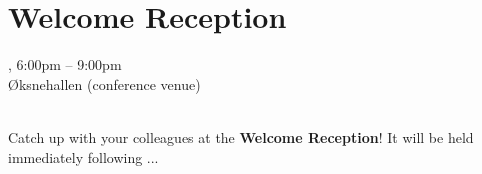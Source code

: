 \clearpage
\section[Welcome Reception]{Welcome Reception}
\setheaders{}{\daydateyear}

\begin{center}



\daydateyear, 6:00pm -- 9:00pm \vspace{1em}\\
Øksnehallen (conference venue)\\
\WelcomeReceptionLoc\\
\end{center}

\noindent Catch up with your colleagues at the \textbf{Welcome
Reception}! It will be held immediately following ...